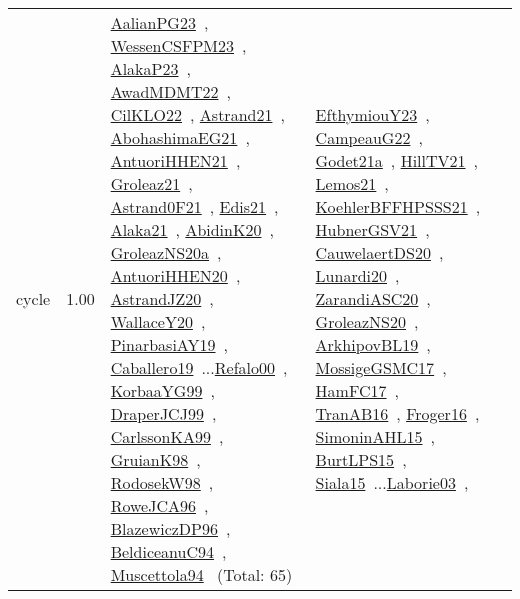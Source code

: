 {\begin{longtable}{p{3cm}r>{\raggedright\arraybackslash}p{6cm}>{\raggedright\arraybackslash}p{6cm}>{\raggedright\arraybackslash}p{8cm}}
\index{cycle}\index{Constraints!cycle}cycle &  1.00 & \href{../works/AalianPG23.pdf}{AalianPG23}~\cite{AalianPG23}, \href{../works/WessenCSFPM23.pdf}{WessenCSFPM23}~\cite{WessenCSFPM23}, \href{../works/AlakaP23.pdf}{AlakaP23}~\cite{AlakaP23}, \href{../works/AwadMDMT22.pdf}{AwadMDMT22}~\cite{AwadMDMT22}, \href{../works/CilKLO22.pdf}{CilKLO22}~\cite{CilKLO22}, \href{../works/Astrand21.pdf}{Astrand21}~\cite{Astrand21}, \href{../works/AbohashimaEG21.pdf}{AbohashimaEG21}~\cite{AbohashimaEG21}, \href{../works/AntuoriHHEN21.pdf}{AntuoriHHEN21}~\cite{AntuoriHHEN21}, \href{../works/Groleaz21.pdf}{Groleaz21}~\cite{Groleaz21}, \href{../works/Astrand0F21.pdf}{Astrand0F21}~\cite{Astrand0F21}, \href{../works/Edis21.pdf}{Edis21}~\cite{Edis21}, \href{../works/Alaka21.pdf}{Alaka21}~\cite{Alaka21}, \href{../works/AbidinK20.pdf}{AbidinK20}~\cite{AbidinK20}, \href{../works/GroleazNS20a.pdf}{GroleazNS20a}~\cite{GroleazNS20a}, \href{../works/AntuoriHHEN20.pdf}{AntuoriHHEN20}~\cite{AntuoriHHEN20}, \href{../works/AstrandJZ20.pdf}{AstrandJZ20}~\cite{AstrandJZ20}, \href{../works/WallaceY20.pdf}{WallaceY20}~\cite{WallaceY20}, \href{../works/PinarbasiAY19.pdf}{PinarbasiAY19}~\cite{PinarbasiAY19}, \href{../works/Caballero19.pdf}{Caballero19}~\cite{Caballero19}...\href{../works/Refalo00.pdf}{Refalo00}~\cite{Refalo00}, \href{../works/KorbaaYG99.pdf}{KorbaaYG99}~\cite{KorbaaYG99}, \href{../works/DraperJCJ99.pdf}{DraperJCJ99}~\cite{DraperJCJ99}, \href{../works/CarlssonKA99.pdf}{CarlssonKA99}~\cite{CarlssonKA99}, \href{../works/GruianK98.pdf}{GruianK98}~\cite{GruianK98}, \href{../works/RodosekW98.pdf}{RodosekW98}~\cite{RodosekW98}, \href{../works/RoweJCA96.pdf}{RoweJCA96}~\cite{RoweJCA96}, \href{../works/BlazewiczDP96.pdf}{BlazewiczDP96}~\cite{BlazewiczDP96}, \href{../works/BeldiceanuC94.pdf}{BeldiceanuC94}~\cite{BeldiceanuC94}, \href{../works/Muscettola94.pdf}{Muscettola94}~\cite{Muscettola94} (Total: 65) & \href{../works/EfthymiouY23.pdf}{EfthymiouY23}~\cite{EfthymiouY23}, \href{../works/CampeauG22.pdf}{CampeauG22}~\cite{CampeauG22}, \href{../works/Godet21a.pdf}{Godet21a}~\cite{Godet21a}, \href{../works/HillTV21.pdf}{HillTV21}~\cite{HillTV21}, \href{../works/Lemos21.pdf}{Lemos21}~\cite{Lemos21}, \href{../works/KoehlerBFFHPSSS21.pdf}{KoehlerBFFHPSSS21}~\cite{KoehlerBFFHPSSS21}, \href{../works/HubnerGSV21.pdf}{HubnerGSV21}~\cite{HubnerGSV21}, \href{../works/CauwelaertDS20.pdf}{CauwelaertDS20}~\cite{CauwelaertDS20}, \href{../works/Lunardi20.pdf}{Lunardi20}~\cite{Lunardi20}, \href{../works/ZarandiASC20.pdf}{ZarandiASC20}~\cite{ZarandiASC20}, \href{../works/GroleazNS20.pdf}{GroleazNS20}~\cite{GroleazNS20}, \href{../works/ArkhipovBL19.pdf}{ArkhipovBL19}~\cite{ArkhipovBL19}, \href{../works/MossigeGSMC17.pdf}{MossigeGSMC17}~\cite{MossigeGSMC17}, \href{../works/HamFC17.pdf}{HamFC17}~\cite{HamFC17}, \href{../works/TranAB16.pdf}{TranAB16}~\cite{TranAB16}, \href{../works/Froger16.pdf}{Froger16}~\cite{Froger16}, \href{../works/SimoninAHL15.pdf}{SimoninAHL15}~\cite{SimoninAHL15}, \href{../works/BurtLPS15.pdf}{BurtLPS15}~\cite{BurtLPS15}, \href{../works/Siala15.pdf}{Siala15}~\cite{Siala15}...\href{../works/Laborie03.pdf}{Laborie03}~\cite{Laborie03}, 
\end{longtable}}
